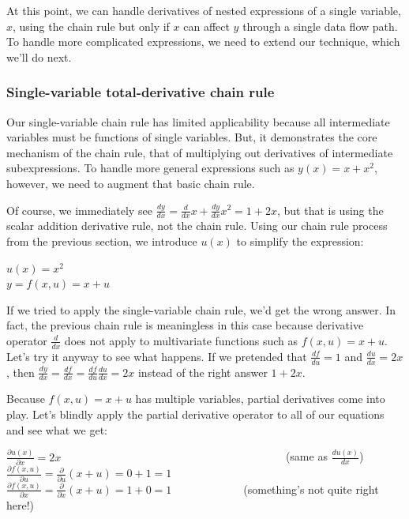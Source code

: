 \documentclass[11pt]{article}
\begin{document}
At this point, we can handle derivatives of nested expressions of a single variable, $x$, using the chain rule but only if $x$ can affect $y$ through a single data flow path. To handle more complicated expressions, we need to extend our technique, which we'll do next.

\subsubsection{Single-variable total-derivative chain rule}

Our single-variable chain rule has limited applicability because all intermediate variables must be functions of single variables. But, it demonstrates the core mechanism of the chain rule, that of multiplying out derivatives of intermediate subexpressions. To handle more general expressions such as $y(x) = x+x^2$, however, we need to augment that basic chain rule.

Of course, we immediately see $\frac{dy}{dx} = \frac{d}{dx}x + \frac{dy}{dx}x^2 = 1 + 2x$, but that is using the scalar  addition derivative rule, not the chain rule.  Using our chain rule process from the previous section, we introduce $u(x)$ to simplify the expression:

$u(x) = x^2$\\
$y = f(x,u) = x + u$

If we tried to apply the single-variable chain rule, we'd get the wrong answer. In fact, the previous chain rule is meaningless in this case because derivative operator $\frac{d}{dx}$ does not apply to multivariate functions such as $f(x,u) = x + u$. Let's try it anyway to see what happens. If we pretended that $\frac{df}{du} = 1$ and $\frac{du}{dx} = 2x$, then $\frac{dy}{dx} = \frac{df}{dx} = \frac{df}{du} \frac{du}{dx} = 2x$ instead of the right answer $1 + 2x$.  

Because $f(x,u) = x + u$ has multiple variables, partial derivatives come into play. Let's blindly apply the partial derivative operator to all of our equations and see what we get:

$\frac{\partial u(x)}{\partial x} = 2x$ ~~~~~~~~~~~~~~~~~~~~~~~~~~~~~~~~~~~~~~~~(same as $\frac{du(x)}{dx}$)\\
$\frac{\partial f(x,u)}{\partial u} = \frac{\partial }{\partial u}(x + u) = 0 + 1 = 1$\\
$\frac{\partial f(x,u)}{\partial x} = \frac{\partial }{\partial x}(x + u) = 1 + 0 = 1$ ~~~~~~~~~\,~~~(something's not quite right here!)\\
\end{document}
